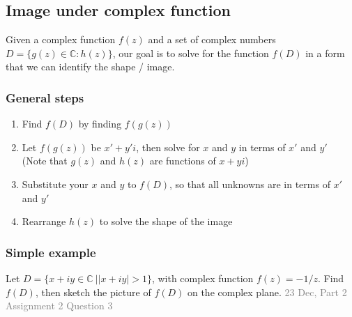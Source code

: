 \documentclass{article}
\newcommand{\note}[1]{\textcolor{gray}{\tiny #1}}
\begin{document}
\subsection{Image under complex function}
Given a complex function $f(z)$ and a set of complex numbers $D=\{g(z)\in \mathds{C}:h(z)\}$, our goal is to solve for the function $f(D)$ in a form that we can identify the shape / image.

\subsubsection{General steps}
\begin{enumerate}
    \item Find $f(D)$ by finding $f(g(z))$
    \item Let $f(g(z))$ be $x'+y'i$, then solve for $x$ and $y$ in terms of $x'$ and $y'$ \\(Note that $g(z)$ and $h(z)$ are functions of $x+yi$)
    \item Substitute your $x$ and $y$ to $f(D)$, so that all unknowns are in terms of $x'$ and $y'$
    \item Rearrange $h(z)$ to solve the shape of the image
\end{enumerate}

\subsubsection{Simple example}
Let $D=\{x+iy \in \mathds{C}\ | |x+iy|>1\}$, with complex function $f(z)=-1/z$. Find $f(D)$, then sketch the picture of $f(D)$ on the complex plane. \note{23 Dec, Part 2 Assignment 2 Question 3}
\end{document}
